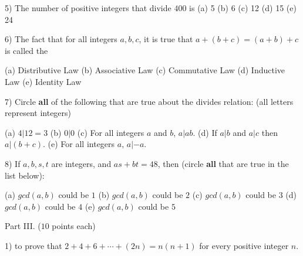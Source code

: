 \documentclass[11pt]{amsart}
\begin{document}
5) The number of positive integers that divide $400$ is\vskip 5pt
\hskip 20pt (a) 5\hfill
\vskip 5pt
\hskip 20pt (b)  6\hfill
\vskip 5pt
\hskip 20pt (c) 12\hfill
\vskip 5pt
\hskip 20pt {\color{red} (d) 15}\hfill
\vskip 5pt
\hskip 20pt (e) 24\hfill

\vfill

6) The fact that for all integers $a,b,c$, it is true that $a+(b+c)=(a + b)+c$ is called the

\vskip 4pt
\hskip 20pt (a) Distributive Law\hfill
\vskip 4pt
\hskip 20pt {\color{red} (b) Associative Law}\hfill
\vskip 4pt
\hskip 20pt (c) Commutative Law\hfill
\vskip 4pt
\hskip 20pt (d) Inductive Law\hfill
\vskip 4pt
\hskip 20pt (e) Identity Law\hfill

\vfill

7) Circle {\bfseries all} of the following that are true about the divides relation:
(all letters 
\vskip -1pt\hskip 13pt represent integers)

\vskip 3pt
\hskip 20pt (a) $4|12=3$\hfill
\vskip 3pt
\hskip 20pt {\color{red} (b) $0|0$}\hfill
\vskip 3pt
\hskip 20pt{\color{red}  (c) For all integers $a$ and $b$,  $a|ab$.}\hfill
\vskip 3pt
\hskip 20pt {\color{red} (d) If $a|b$ and $a|c$ then $a|(b+c)$.}\hfill
\vskip 3pt
\hskip 20pt {\color{red} (e) For all integers $a$, $a| -a$.}\hfill

\vfill

8) If $a,b,s,t$ are integers, and $as+bt=48$, then (circle {\bfseries all} that are true in the list below):

\vskip 3pt
\hskip 20pt {\color{red} (a) $gcd(a,b)$ could be $1$}\hfill
\vskip 3pt
\hskip 20pt {\color{red} (b) $gcd(a,b)$ could be $2$}\hfill
\vskip 3pt
\hskip 20pt {\color{red} (c) $gcd(a,b)$ could be $3$}\hfill
\vskip 3pt
\hskip 20pt {\color{red} (d) $gcd(a,b)$ could be $4$}\hfill
\vskip 3pt
\hskip 20pt (e) $gcd(a,b)$ could be $5$\hfill

\vfill
\break

\begin{center}
Part III. ($10$ points each)  
\end{center}
\begin{center}
\end{center}

\medskip

1)  to prove that 
$\displaystyle 2+4+6+\cdots+(2n) = n(n+1)$ for every positive integer $n$.\\[3pt]
\end{document}
